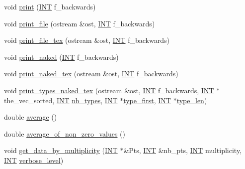 \begin{DoxyCompactItemize}
\item 
void \mbox{\hyperlink{classclassify_a56d1941250d46f68a41566aac4331bc1}{print}} (\mbox{\hyperlink{galois_8h_a09fddde158a3a20bd2dcadb609de11dc}{I\+NT}} f\+\_\+backwards)
\item 
void \mbox{\hyperlink{classclassify_a9ca3960a8955968d2b0ef7beb4189d7b}{print\+\_\+file}} (ostream \&ost, \mbox{\hyperlink{galois_8h_a09fddde158a3a20bd2dcadb609de11dc}{I\+NT}} f\+\_\+backwards)
\item 
void \mbox{\hyperlink{classclassify_a10332f3ce5f2b7df7767d3c6b02aaa58}{print\+\_\+file\+\_\+tex}} (ostream \&ost, \mbox{\hyperlink{galois_8h_a09fddde158a3a20bd2dcadb609de11dc}{I\+NT}} f\+\_\+backwards)
\item 
void \mbox{\hyperlink{classclassify_ae9b3a00649b393290673bf96c1630996}{print\+\_\+naked}} (\mbox{\hyperlink{galois_8h_a09fddde158a3a20bd2dcadb609de11dc}{I\+NT}} f\+\_\+backwards)
\item 
void \mbox{\hyperlink{classclassify_ad01a54dbdaa22d7a7c8e952850dcc3be}{print\+\_\+naked\+\_\+tex}} (ostream \&ost, \mbox{\hyperlink{galois_8h_a09fddde158a3a20bd2dcadb609de11dc}{I\+NT}} f\+\_\+backwards)
\item 
void \mbox{\hyperlink{classclassify_a36a3de15470d458d85e524ef94e8a826}{print\+\_\+types\+\_\+naked\+\_\+tex}} (ostream \&ost, \mbox{\hyperlink{galois_8h_a09fddde158a3a20bd2dcadb609de11dc}{I\+NT}} f\+\_\+backwards, \mbox{\hyperlink{galois_8h_a09fddde158a3a20bd2dcadb609de11dc}{I\+NT}} $\ast$the\+\_\+vec\+\_\+sorted, \mbox{\hyperlink{galois_8h_a09fddde158a3a20bd2dcadb609de11dc}{I\+NT}} \mbox{\hyperlink{classclassify_a0baeeb9626a0611f111335dcaaaaad5c}{nb\+\_\+types}}, \mbox{\hyperlink{galois_8h_a09fddde158a3a20bd2dcadb609de11dc}{I\+NT}} $\ast$\mbox{\hyperlink{classclassify_aea8eead047af96cea4ddcd00498882cb}{type\+\_\+first}}, \mbox{\hyperlink{galois_8h_a09fddde158a3a20bd2dcadb609de11dc}{I\+NT}} $\ast$\mbox{\hyperlink{classclassify_aa154069de433b7b013b874427fd4d29f}{type\+\_\+len}})
\item 
double \mbox{\hyperlink{classclassify_ac08117e901a9f99c3fc9e222c52ef728}{average}} ()
\item 
double \mbox{\hyperlink{classclassify_aea9133adcd9cb485cb049deadddb3354}{average\+\_\+of\+\_\+non\+\_\+zero\+\_\+values}} ()
\item 
void \mbox{\hyperlink{classclassify_aabcac177dd0cd34178da9a0e9252d5d9}{get\+\_\+data\+\_\+by\+\_\+multiplicity}} (\mbox{\hyperlink{galois_8h_a09fddde158a3a20bd2dcadb609de11dc}{I\+NT}} $\ast$\&Pts, \mbox{\hyperlink{galois_8h_a09fddde158a3a20bd2dcadb609de11dc}{I\+NT}} \&nb\+\_\+pts, \mbox{\hyperlink{galois_8h_a09fddde158a3a20bd2dcadb609de11dc}{I\+NT}} multiplicity, \mbox{\hyperlink{galois_8h_a09fddde158a3a20bd2dcadb609de11dc}{I\+NT}} \mbox{\hyperlink{simeon_8_c_a818073fbcc2f439e7c56952f67386122}{verbose\+\_\+level}})

\end{DoxyCompactItemize}
